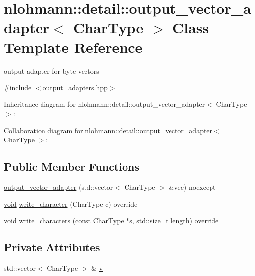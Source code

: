 \hypertarget{classnlohmann_1_1detail_1_1output__vector__adapter}{}\section{nlohmann\+:\+:detail\+:\+:output\+\_\+vector\+\_\+adapter$<$ Char\+Type $>$ Class Template Reference}
\label{classnlohmann_1_1detail_1_1output__vector__adapter}


output adapter for byte vectors  




{\ttfamily \#include $<$output\+\_\+adapters.\+hpp$>$}



Inheritance diagram for nlohmann\+:\+:detail\+:\+:output\+\_\+vector\+\_\+adapter$<$ Char\+Type $>$\+:


Collaboration diagram for nlohmann\+:\+:detail\+:\+:output\+\_\+vector\+\_\+adapter$<$ Char\+Type $>$\+:
\subsection*{Public Member Functions}
\begin{DoxyCompactItemize}
\item 
\hyperlink{classnlohmann_1_1detail_1_1output__vector__adapter_a9c4fbf88fda356837038ec30a264cd3e}{output\+\_\+vector\+\_\+adapter} (std\+::vector$<$ Char\+Type $>$ \&vec) noexcept
\item 
\hyperlink{namespacenlohmann_1_1detail_a59fca69799f6b9e366710cb9043aa77d}{void} \hyperlink{classnlohmann_1_1detail_1_1output__vector__adapter_af6a22d4210bb7bc2da66021300ddd6db}{write\+\_\+character} (Char\+Type c) override
\item 
\hyperlink{namespacenlohmann_1_1detail_a59fca69799f6b9e366710cb9043aa77d}{void} \hyperlink{classnlohmann_1_1detail_1_1output__vector__adapter_ad6f6c461dec7bedd5359454dc22fc9aa}{write\+\_\+characters} (const Char\+Type $\ast$s, std\+::size\+\_\+t length) override
\end{DoxyCompactItemize}
\subsection*{Private Attributes}
\begin{DoxyCompactItemize}
\item 
std\+::vector$<$ Char\+Type $>$ \& \hyperlink{classnlohmann_1_1detail_1_1output__vector__adapter_a9b1ed9fba14e671ae1abb6692560ef3f}{v}
\end{DoxyCompactItemize}


